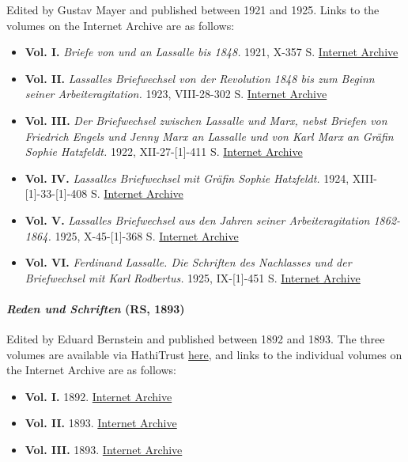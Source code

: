 Edited by Gustav Mayer and published between 1921 and 1925. Links to the volumes on the Internet Archive are as follows:
\begin{itemize}
    \item \textbf{Vol. I.} \textit{Briefe von und an Lassalle bis 1848.} 1921, X-357 S. \href{https://archive.org/details/nachgelassenebri01lassuoft/}{Internet Archive}
    \item \textbf{Vol. II.} \textit{Lassalles Briefwechsel von der Revolution 1848 bis zum Beginn seiner Arbeiteragitation.} 1923, VIII-28-302 S. \href{https://archive.org/details/nachgelassenebri02lassuoft/}{Internet Archive}
    \item \textbf{Vol. III.} \textit{Der Briefwechsel zwischen Lassalle und Marx, nebst Briefen von Friedrich Engels und Jenny Marx an Lassalle und von Karl Marx an Gräfin Sophie Hatzfeldt.} 1922, XII-27-[1]-411 S. \href{https://archive.org/details/nachgelassenebri03lassuoft/}{Internet Archive}
    \item \textbf{Vol. IV.} \textit{Lassalles Briefwechsel mit Gräfin Sophie Hatzfeldt.} 1924, XIII-[1]-33-[1]-408 S. \href{https://archive.org/details/nachgelassenebri04lassuoft/}{Internet Archive}
    \item \textbf{Vol. V.} \textit{Lassalles Briefwechsel aus den Jahren seiner Arbeiteragitation 1862-1864.} 1925, X-45-[1]-368 S. \href{https://archive.org/details/nachgelassenebri05lassuoft/}{Internet Archive}
    \item \textbf{Vol. VI.} \textit{Ferdinand Lassalle. Die Schriften des Nachlasses und der Briefwechsel mit Karl Rodbertus.} 1925, IX-[1]-451 S. \href{https://archive.org/details/nachgelassenebri06lassuoft/}{Internet Archive}
\end{itemize}

\paragraph{\textit{Reden und Schriften} (RS, 1893)}

Edited by Eduard Bernstein and published between 1892 and 1893. The three volumes are available via HathiTrust \href{https://catalog.hathitrust.org/Record/008708164}{here}, and links to the individual volumes on the Internet Archive are as follows:

\begin{itemize}
    \item \textbf{Vol. I.} 1892. \href{https://archive.org/details/redenundschrifte01lassuoft/}{Internet Archive}
    \item \textbf{Vol. II.} 1893. \href{https://archive.org/details/redenundschrifte02lassuoft/}{Internet Archive}
    \item \textbf{Vol. III.} 1893. \href{https://archive.org/details/redenundschrifte03lassuoft/}{Internet Archive}
\end{itemize}

